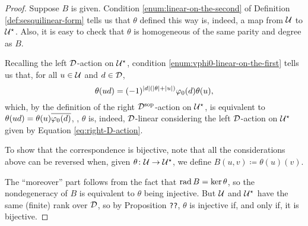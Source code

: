\begin{proof}
    Suppose $B$ is given. Condition \eqref{enum:linear-on-the-second} of Definition \ref{def:sesquilinear-form} tells us that $\theta$ defined this way is, indeed, a map from $\mathcal U$ to $\mathcal U^\star$. 
    Also, it is easy to check that $\theta$ is homogeneous of the same parity and degree as $B$.
    
    Recalling the left $\mathcal{D}$-action on $\mathcal U^\star$, condition \eqref{enum:vphi0-linear-on-the-first} tells us that, for all $u\in \mathcal U$ and $d\in \mathcal{D}$,
    \[
        \theta (ud) = (-1)^{|d|(|\theta|+|u|)}\varphi_0 (d) \theta (u),
    \]
    which, by the definition of the right $\mathcal{D}^{\mathrm{sop}}$-action on $\mathcal U^\star$, is equivalent to $\theta(ud) = \theta(u) \overline{\varphi_0(d)}$, \ie, $\theta$ is, indeed, $\mathcal{D}$-linear considering the left $\mathcal{D}$-action on $\mathcal U^\star$ given by Equation \eqref{eq:right-D-action}.
    
    To show that the correspondence is bijective, note that all the considerations above can be reversed when, given $\theta\colon \mathcal U \to \mathcal U^\star$, we define  $B(u, v) \coloneqq \theta(u)(v)$.
    
    The ``moreover'' part follows from the fact that $\operatorname{rad} B = \ker \theta$, so the nondegeneracy of $B$ is equivalent to $\theta$ being injective. But $\mathcal U$ and $\mathcal U^\star$ have the same (finite) rank over $\mathcal{D}$, so by Proposition {\tt ??}, $\theta$ is injective if, and only if, it is bijective.
\end{proof}





